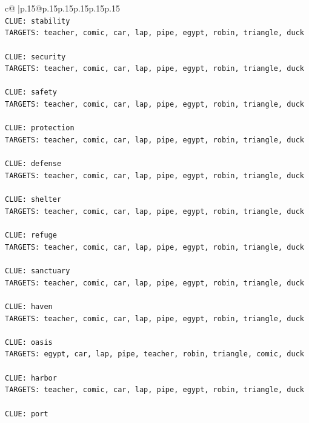 \documentclass{article}
\begin{document}
{\begin{supertabular}{c@{$\;$}|p{.15\linewidth}@{}p{.15\linewidth}p{.15\linewidth}p{.15\linewidth}p{.15\linewidth}p{.15\linewidth}}
{{{\\ 
\texttt{CLUE: stability} \\
\texttt{TARGETS: teacher, comic, car, lap, pipe, egypt, robin, triangle, duck} \\
\\ 
\texttt{CLUE: security} \\
\texttt{TARGETS: teacher, comic, car, lap, pipe, egypt, robin, triangle, duck} \\
\\ 
\texttt{CLUE: safety} \\
\texttt{TARGETS: teacher, comic, car, lap, pipe, egypt, robin, triangle, duck} \\
\\ 
\texttt{CLUE: protection} \\
\texttt{TARGETS: teacher, comic, car, lap, pipe, egypt, robin, triangle, duck} \\
\\ 
\texttt{CLUE: defense} \\
\texttt{TARGETS: teacher, comic, car, lap, pipe, egypt, robin, triangle, duck} \\
\\ 
\texttt{CLUE: shelter} \\
\texttt{TARGETS: teacher, comic, car, lap, pipe, egypt, robin, triangle, duck} \\
\\ 
\texttt{CLUE: refuge} \\
\texttt{TARGETS: teacher, comic, car, lap, pipe, egypt, robin, triangle, duck} \\
\\ 
\texttt{CLUE: sanctuary} \\
\texttt{TARGETS: teacher, comic, car, lap, pipe, egypt, robin, triangle, duck} \\
\\ 
\texttt{CLUE: haven} \\
\texttt{TARGETS: teacher, comic, car, lap, pipe, egypt, robin, triangle, duck} \\
\\ 
\texttt{CLUE: oasis} \\
\texttt{TARGETS: egypt, car, lap, pipe, teacher, robin, triangle, comic, duck} \\
\\ 
\texttt{CLUE: harbor} \\
\texttt{TARGETS: teacher, comic, car, lap, pipe, egypt, robin, triangle, duck} \\
\\ 
\texttt{CLUE: port} \\
}}}
\end{supertabular}}
\end{document}
